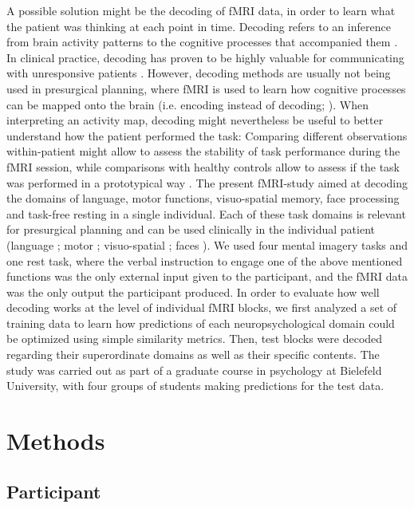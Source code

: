 \documentclass[fleqn,10pt]{SelfArx} %
\begin{document}
A possible solution might be the decoding of fMRI data, in order to learn what the patient was thinking at each point in time. Decoding refers to an inference from brain activity patterns to the cognitive processes that accompanied them \citep{Poldrack_2006,  Haynes_2006}. In clinical practice, decoding has proven to be highly valuable for communicating with unresponsive patients \citep{Owen_2006, Boly_2007, Sorger_2012}. However, decoding methods are usually not being used in presurgical planning, where fMRI is used to learn how cognitive processes can be mapped onto the brain (i.e. encoding instead of decoding; \citet{Naselaris_2011}). When interpreting an activity map, decoding might nevertheless be useful to better understand how the patient performed the task: Comparing different observations within-patient might allow to assess the stability of task performance during the fMRI session, while comparisons with healthy controls allow to assess if the task was performed in a prototypical way \citep{Dubois_2016}. The present fMRI-study aimed at decoding the domains of language, motor functions, visuo-spatial memory, face processing and task-free resting in a single individual. Each of these task domains is relevant for presurgical planning and can be used clinically in the individual patient (language \citep{Woermann_2003}; motor \citep{H_berg_2004}; visuo-spatial \citep{Jokeit_2001}; faces \citep{Parvizi_2012}). We used four mental imagery tasks and one rest task, where the verbal instruction to engage one of the above mentioned functions was the only external input given to the participant, and the fMRI data was the only output the participant produced. 
In order to evaluate how well decoding works at the level of individual fMRI blocks, we first analyzed a set of training data to learn how predictions of each neuropsychological domain could be optimized using simple similarity metrics. Then, test blocks were decoded regarding their superordinate domains as well as their specific contents. The study was carried out as part of a graduate course in psychology at Bielefeld University, with four groups of students making predictions for the test data.

\section{Methods}

\subsection{Participant}
\end{document}
